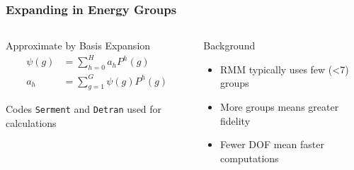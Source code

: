 \documentclass[fleqn]{beamer}
\begin{document}
  \begin{frame}
      \frametitle{Expanding in Energy Groups}
      \begin{columns}[T]
          \begin{column}{0.5\textwidth}
              Approximate by Basis Expansion
              \begin{equation*}
                  \begin{split}
                      \psi(g) &= \sum^H_{h=0} a_h P^h(g) \\
                      a_h &= \sum^G_{g=1} \psi(g) P^h(g)
                  \end{split}
              \end{equation*}
              
              Codes {\tt Serment} and {\tt Detran} used for calculations
          \end{column}
          \begin{column}{0.5\textwidth}
              \begin{block}{Background}
                  \begin{itemize}
                      \item RMM typically uses few (<7) groups
                      \item More groups means greater fidelity
                      \item Fewer DOF mean faster computations
                  \end{itemize}
              \end{block}
          \end{column}
    \end{columns}
  \end{frame}
  
\end{document}
